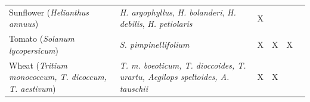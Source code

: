 \documentclass[11pt]{article}
\begin{document}
\begin{adjustbox}{angle=90}
\begin{tabular}{G{3cm}G{3.5cm}G{3cm}G{3.5cm}G{3.5cm}G{2cm}}
Sunflower (\emph{Helianthus annuus}) & \emph{H. argophyllus}, \emph{H. bolanderi}, \emph{H. debilis}, \emph{H. petiolaris} & X &   &   & \cite{rieseberg2007hybridization}\\
Tomato (\emph{Solanum lycopersicum}) & \emph{S. pimpinellifolium} & X & X & X & \cite{rick1958role} \\

 Wheat (\emph{Tritium monococcum, T. dicoccum, T. aestivum}) & \emph{T. m. boeoticum, T. dioccoides, T. urartu, Aegilops speltoides, A. tauschii} & X & X &  & \cite{zohary1969wild} \\
    \end{tabular}
\end{adjustbox}



\end{document}
